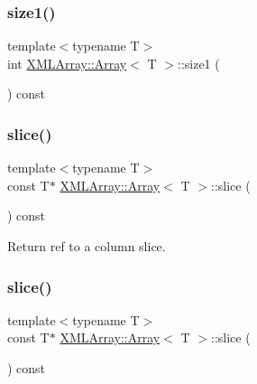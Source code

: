 \mbox{\label{classXMLArray_1_1Array_a33e863988af56d045439d31058088c8c}} 
\subsubsection{\texorpdfstring{size1()}{size1()}\hspace{0.1cm}{\footnotesize\ttfamily [3/3]}}
{\footnotesize\ttfamily template$<$typename T$>$ \\
int \mbox{\hyperlink{classXMLArray_1_1Array}{X\+M\+L\+Array\+::\+Array}}$<$ T $>$\+::size1 (\begin{DoxyParamCaption}{ }\end{DoxyParamCaption}) const\hspace{0.3cm}{\ttfamily [inline]}}

\mbox{\label{classXMLArray_1_1Array_a9c9e3fdc44557d1241103c207f7f69af}} 
\subsubsection{\texorpdfstring{slice()}{slice()}\hspace{0.1cm}{\footnotesize\ttfamily [1/3]}}
{\footnotesize\ttfamily template$<$typename T$>$ \\
const T$\ast$ \mbox{\hyperlink{classXMLArray_1_1Array}{X\+M\+L\+Array\+::\+Array}}$<$ T $>$\+::slice (\begin{DoxyParamCaption}{ }\end{DoxyParamCaption}) const\hspace{0.3cm}{\ttfamily [inline]}}



Return ref to a column slice. 

\mbox{\label{classXMLArray_1_1Array_a9c9e3fdc44557d1241103c207f7f69af}} 
\subsubsection{\texorpdfstring{slice()}{slice()}\hspace{0.1cm}{\footnotesize\ttfamily [2/3]}}
{\footnotesize\ttfamily template$<$typename T$>$ \\
const T$\ast$ \mbox{\hyperlink{classXMLArray_1_1Array}{X\+M\+L\+Array\+::\+Array}}$<$ T $>$\+::slice (\begin{DoxyParamCaption}{ }\end{DoxyParamCaption}) const\hspace{0.3cm}{\ttfamily [inline]}}



